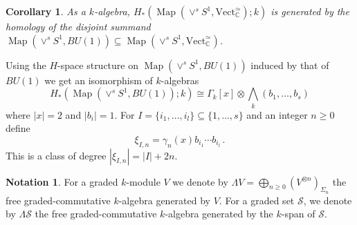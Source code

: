 \documentclass[oneside, a4paper, 12pt]{article}
\numberwithin{equation}{section}
\newcommand{\C}{\mathbb{C}}
\newcommand{\Vect}{\mathrm{Vect}}
\newcommand{\Map}{\operatorname{Map}}
\theoremstyle{plain}
\newtheorem{corollary}[theorem]{Corollary}
\theoremstyle{definition}
\newtheorem{notation}[theorem]{Notation}
\theoremstyle{remark}
\begin{document}
\begin{corollary} \label{cor:generation}
As a $k$-algebra, $H_\ast(\Map(\vee^s S^1,\Vect_{\C}^{\simeq});k)$ is generated by the homology of the disjoint summand $\Map(\vee^s S^1,BU(1))\subseteq \Map(\vee^s S^1,\Vect_{\C}^{\simeq})$.
\end{corollary}



Using the $H$-space structure on $\Map(\vee^s S^1,BU(1))$ induced by that of $BU(1)$ we get an isomorphism of $k$-algebras
\begin{equation} \label{eq:homologydim1}
H_\ast(\Map(\vee^s S^1,BU(1));k)\cong \Gamma_k[x]\otimes {\textstyle \bigwedge_k}(b_1,\dots,b_s)
\end{equation}
where $|x|=2$ and $|b_i|=1$. For $I=\{i_1,\dots,i_l\}\subseteq \{1,\dots,s\}$ and an integer $n\geq 0$ define
\[
\xi_{I,n}=\gamma_n(x) b_{i_1}\cdots b_{i_l}\,.
\]
This is a class of degree $|\xi_{I,n}|=|I|+2n$.

\begin{notation}
For a graded $k$-module $V$ we denote by $\Lambda V=\bigoplus_{n\geq 0} (V^{\otimes n})_{\Sigma_n}$ the free graded-commutative $k$-algebra generated by $V$. For a graded set $\mathscr{S}$, we denote by $\Lambda \mathscr{S}$ the free graded-commutative $k$-algebra generated by the $k$-span of $\mathscr{S}$.
\end{notation}
\end{document}
